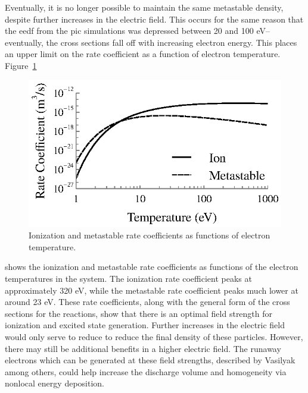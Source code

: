 Eventually, it is no longer possible to maintain the same metastable density,
despite further increases in the electric field. This occurs for the same reason
that the \acs{eedf} from the \acs{pic} simulations was depressed between 20 and
100 eV--eventually, the cross sections fall off with increasing electron energy.
This places an upper limit on the rate coefficient as a function of electron
temperature. Figure~\ref{fig:longrates}
\begin{figure}
  \centering
  \includegraphics{./chapters/modeling/figures/longrates.eps}
  \caption{Ionization and metastable rate coefficients as functions of
    electron temperature.}
  \label{fig:longrates}
\end{figure}
shows the ionization and metastable rate coefficients as functions of the
electron temperatures in the system. The ionization rate coefficient peaks at
approximately 320 eV, while the metastable rate coefficient peaks much lower at
around 23 eV. These rate coefficients, along with the general form of the cross
sections for the reactions, show that there is an optimal field strength for
ionization and excited state generation. Further increases in the electric field
would only serve to reduce to reduce the final density of these particles.
However, there may still be additional benefits in a higher electric field. The
runaway electrons which can be generated at these field strengths, described by
Vasilyak \cite{Vasilyak1994} among others, could help increase the discharge
volume and homogeneity via nonlocal energy deposition.

